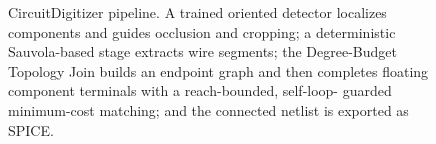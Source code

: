 \begin{figure}[H]
{
}
\caption{CircuitDigitizer pipeline. A trained oriented detector localizes
components and guides occlusion and cropping; a deterministic Sauvola-based stage
extracts wire segments; the Degree-Budget Topology Join builds an endpoint graph
and then completes floating component terminals with a reach-bounded, self-loop-
guarded minimum-cost matching; and the connected netlist is exported as SPICE.}
\label{fig:architecture}
\end{figure}
